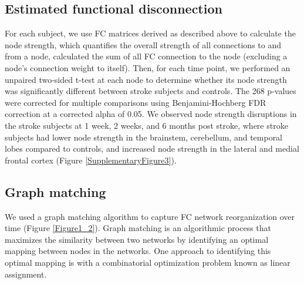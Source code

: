 \documentclass[phd,tocprelim]{cornell}
\begin{document}
	\subsection{Estimated functional disconnection}
	For each subject, we use FC matrices derived as described above to calculate the node strength, which quantifies the overall strength of all connections to and from a node, calculated the sum of all FC connection to the node (excluding a node's connection weight to itself). Then, for each time point, we performed an unpaired two-sided t-test at each node to determine whether its node strength was significantly different between stroke subjects and controls. The 268 p-values were corrected for multiple comparisons using Benjamini-Hochberg FDR correction at a corrected alpha of 0.05. We observed node strength disruptions in the stroke subjects at 1 week, 2 weeks, and 6 months post stroke, where stroke subjects had lower node strength in the brainstem, cerebellum, and temporal lobes compared to controls, and increased node strength in the lateral and medial frontal cortex (Figure \ref{SupplementaryFigure3}).
	
	\subsection{Graph matching}
	We used a graph matching algorithm to capture FC network reorganization over time (Figure \ref{Figure1_2}). Graph matching is an algorithmic process that maximizes the similarity between two networks by identifying an optimal mapping between nodes in the networks. One approach to identifying this optimal mapping is with a combinatorial optimization problem known as linear assignment. 
	
\end{document}
